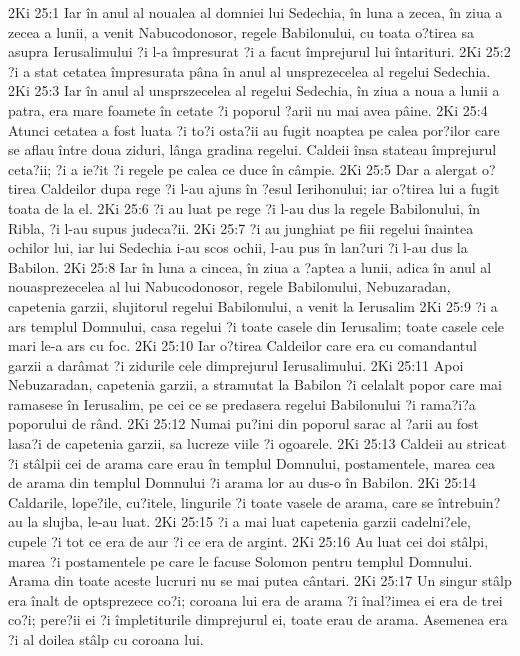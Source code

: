 2Ki 25:1  Iar în anul al noualea al domniei lui Sedechia, în luna a zecea, în ziua a zecea a lunii, a venit Nabucodonosor, regele Babilonului, cu toata o?tirea sa asupra Ierusalimului ?i l-a împresurat ?i a facut împrejurul lui întarituri.
2Ki 25:2  ?i a stat cetatea împresurata pâna în anul al unsprezecelea al regelui Sedechia.
2Ki 25:3  Iar în anul al unsprszecelea al regelui Sedechia, în ziua a noua a lunii a patra, era mare foamete în cetate ?i poporul ?arii nu mai avea pâine.
2Ki 25:4  Atunci cetatea a fost luata ?i to?i osta?ii au fugit noaptea pe calea por?ilor care se aflau între doua ziduri, lânga gradina regelui. Caldeii însa stateau împrejurul ceta?ii; ?i a ie?it ?i regele pe calea ce duce în câmpie.
2Ki 25:5  Dar a alergat o?tirea Caldeilor dupa rege ?i l-au ajuns în ?esul Ierihonului; iar o?tirea lui a fugit toata de la el.
2Ki 25:6  ?i au luat pe rege ?i l-au dus la regele Babilonului, în Ribla, ?i l-au supus judeca?ii.
2Ki 25:7  ?i au junghiat pe fiii regelui înaintea ochilor lui, iar lui Sedechia i-au scos ochii, l-au pus în lan?uri ?i l-au dus la Babilon.
2Ki 25:8  Iar în luna a cincea, în ziua a ?aptea a lunii, adica în anul al nouasprezecelea al lui Nabucodonosor, regele Babilonului, Nebuzaradan, capetenia garzii, slujitorul regelui Babilonului, a venit la Ierusalim
2Ki 25:9  ?i a ars templul Domnului, casa regelui ?i toate casele din Ierusalim; toate casele cele mari le-a ars cu foc.
2Ki 25:10  Iar o?tirea Caldeilor care era cu comandantul garzii a darâmat ?i zidurile cele dimprejurul Ierusalimului.
2Ki 25:11  Apoi Nebuzaradan, capetenia garzii, a stramutat la Babilon ?i celalalt popor care mai ramasese în Ierusalim, pe cei ce se predasera regelui Babilonului ?i rama?i?a poporului de rând.
2Ki 25:12  Numai pu?ini din poporul sarac al ?arii au fost lasa?i de capetenia garzii, sa lucreze viile ?i ogoarele.
2Ki 25:13  Caldeii au stricat ?i stâlpii cei de arama care erau în templul Domnului, postamentele, marea cea de arama din templul Domnului ?i arama lor au dus-o în Babilon.
2Ki 25:14  Caldarile, lope?ile, cu?itele, lingurile ?i toate vasele de arama, care se întrebuin?au la slujba, le-au luat.
2Ki 25:15  ?i a mai luat capetenia garzii cadelni?ele, cupele ?i tot ce era de aur ?i ce era de argint.
2Ki 25:16  Au luat cei doi stâlpi, marea ?i postamentele pe care le facuse Solomon pentru templul Domnului. Arama din toate aceste lucruri nu se mai putea cântari.
2Ki 25:17  Un singur stâlp era înalt de optsprezece co?i; coroana lui era de arama ?i înal?imea ei era de trei co?i; pere?ii ei ?i împletiturile dimprejurul ei, toate erau de arama. Asemenea era ?i al doilea stâlp cu coroana lui.
